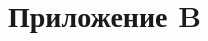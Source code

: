 \documentclass[../main/main.tex]{subfiles}
\begin{document}
    \newpage
    \section{Приложение B}
    \label{sec:listings}
    \begin{lstlisting}
    \end{lstlisting}
\end{document}
